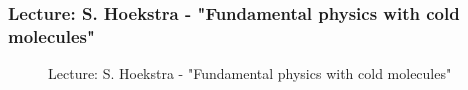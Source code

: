 \documentclass[11pt,a4paper]{article}
\numberwithin{equation}{section}
\numberwithin{table}{section}\setlength{\multlinegap}{25pt}
\begin{document}
\subsubsection{Lecture: S. Hoekstra - "Fundamental physics with cold molecules"}

\begin{figure}[H]
\centering
\null\hfill %
\hfill %
\hfill %
\hfill %
\hfill\null %
\caption{Lecture: S. Hoekstra - "Fundamental physics with cold molecules"}
\end{figure}
\end{document}
